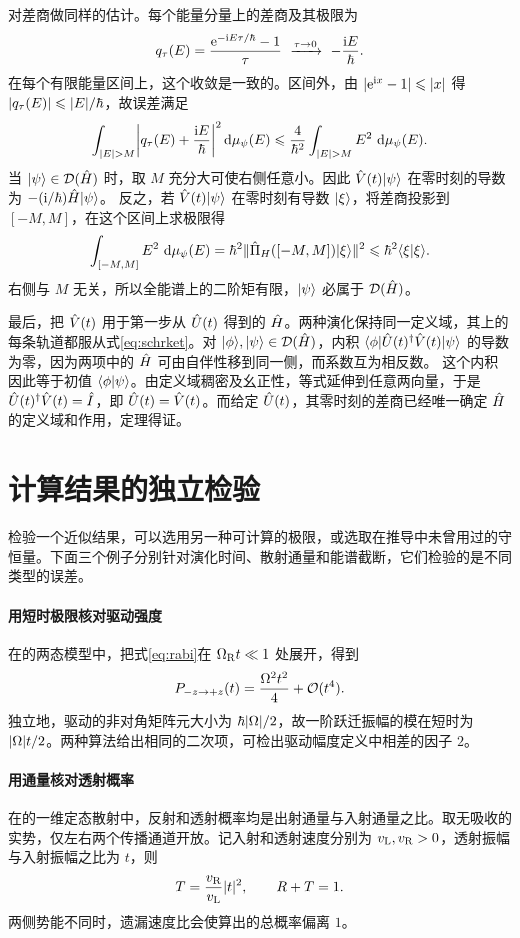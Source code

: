 对差商做同样的估计。每个能量分量上的差商及其极限为
\[
    q_\tau(E) = \frac{\mathop{}\!\mathrm{e}^{-\mathrm{i} E\tau/\hbar} - 1}{\tau}
        \ \xrightarrow{\tau\to0}\  - \frac{\mathrm{i} E}{\hbar}.
\]
在每个有限能量区间上，这个收敛是一致的。区间外，由 $\lvert\mathop{}\!\mathrm{e}^{\mathrm{i} x} - 1\rvert \leqslant \lvert x\rvert$ 得 $\lvert q_\tau(E)\rvert \leqslant \lvert E\rvert/\hbar$，故误差满足
\[
    \int_{\lvert E\rvert>M}\biggl\lvert q_\tau(E) + \frac{\mathrm{i} E}{\hbar}\biggr\rvert^2\mathop{}\!\mathrm{d}\mu_\psi(E)
        \leqslant \frac{4}{\hbar^2}\int_{\lvert E\rvert>M}E^2\,\mathop{}\!\mathrm{d}\mu_\psi(E).
\]
当 $\lvert\psi\rangle \in \mathcal D(\hat{H})$ 时，取 $M$ 充分大可使右侧任意小。因此 $\hat{V}(t)\lvert\psi\rangle$ 在零时刻的导数为 $-(\mathrm{i}/\hbar)\hat{H}\lvert\psi\rangle$。
反之，若 $\hat{V}(t)\lvert\psi\rangle$ 在零时刻有导数 $\lvert\xi\rangle$，将差商投影到 $[-M,M]$，在这个区间上求极限得
\[
    \int_{[-M,M]} E^2\,\mathop{}\!\mathrm{d}\mu_\psi(E)
    = \hbar^2\lVert\hat{\Pi}_H([-M,M])\lvert\xi\rangle\rVert^2 \leqslant \hbar^2\langle\xi\vert\xi\rangle .
\]
右侧与 $M$ 无关，所以全能谱上的二阶矩有限，$\lvert\psi\rangle$ 必属于 $\mathcal D(\hat{H})$。

最后，把 $\hat{V}(t)$ 用于第一步从 $\hat{U}(t)$ 得到的 $\hat{H}$。两种演化保持同一定义域，其上的每条轨道都服从式\eqref{eq:schrket}。对 $\lvert\phi\rangle,\lvert\psi\rangle \in \mathcal D(\hat{H})$，内积
$\langle\phi\vert\hat{U}(t)^\dagger\hat{V}(t)\vert\psi\rangle$ 的导数为零，因为两项中的 $\hat{H}$ 可由自伴性移到同一侧，而系数互为相反数。
这个内积因此等于初值 $\langle\phi\vert\psi\rangle$。由定义域稠密及幺正性，等式延伸到任意两向量，于是 $\hat{U}(t)^\dagger\hat{V}(t) = \hat{I}$，即 $\hat{U}(t) = \hat{V}(t)$。而给定 $\hat{U}(t)$，其零时刻的差商已经唯一确定 $\hat{H}$ 的定义域和作用，定理得证。

\section{计算结果的独立检验}
检验一个近似结果，可以选用另一种可计算的极限，或选取在推导中未曾用过的守恒量。下面三个例子分别针对演化时间、散射通量和能谱截断，它们检验的是不同类型的误差。

\paragraph*{用短时极限核对驱动强度}
在的两态模型中，把式\eqref{eq:rabi}在 $\Omega_{\mathrm{R}} t \ll 1$ 处展开，得到
\[
    P_{-z\to+z}(t) = \frac{\Omega^2t^2}{4} + \mathcal{O}(t^4).
\]
独立地，驱动的非对角矩阵元大小为 $\hbar\lvert\Omega\rvert/2$，故一阶跃迁振幅的模在短时为 $\lvert\Omega\rvert t/2$。两种算法给出相同的二次项，可检出驱动幅度定义中相差的因子 $2$。

\paragraph*{用通量核对透射概率}
在的一维定态散射中，反射和透射概率均是出射通量与入射通量之比。取无吸收的实势，仅左右两个传播通道开放。记入射和透射速度分别为 $v_{\mathrm{L}},v_{\mathrm{R}} > 0$，透射振幅与入射振幅之比为 $t$，则
\[
    T = \frac{v_{\mathrm{R}}}{v_{\mathrm{L}}}\lvert t\rvert^2,\qquad R + T = 1 .
\]
两侧势能不同时，遗漏速度比会使算出的总概率偏离 $1$。

